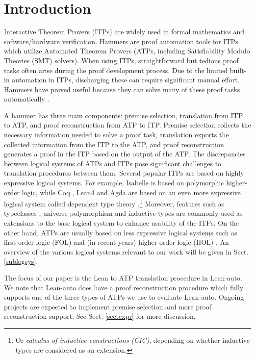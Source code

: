 \section{Introduction}

  Interactive Theorem Provers (ITPs) \cite{Harrison2014HistoryOI}
  are widely used in formal mathematics and software/hardware verification. Hammers
  \cite{Blanchette2016HammeringTQ,Czajka2018HammerFC} are proof automation tools for
  ITPs which utilize Automated Theorem Provers (ATPs, including Satisfiability Modulo Theories (SMT) solvers).
  When using ITPs, straightforward but tedious proof
  tasks often arise during the proof development process.  Due to the limited
  built-in automation in ITPs, discharging these can require significant
  manual effort. Hammers have proved useful
  because they can solve many of these proof tasks automatically \cite{Paulson2012ThreeYO}.
  
  A hammer has three main components: premise selection, translation from ITP to
  ATP, and proof reconstruction from ATP to ITP. Premise selection collects
  the necessary information needed to solve a proof task, translation exports
  the collected information from the ITP to the ATP, and proof reconstruction generates
  a proof in the ITP based on the output of the ATP. The discrepancies between logical systems of ATPs and ITPs pose
  significant challenges to translation procedures between them.
  Several popular ITPs are based on highly expressive logical systems.
  For example, Isabelle \cite{Isabelle} is based on polymorphic higher-order logic, while
  Coq \cite{CoqRefMan}, Lean4 \cite{Lean4} and Agda \cite{Agda}
  are based on an even more expressive logical system called dependent type
  theory \cite{LambdaWithType,Coquand1988}.\footnote{Or \textit{calculus of inductive constructions (CIC)}, depending
  on whether inductive types are considered as an extension.}
  Moreover, features such as typeclasses \cite{TypeClassHaskell}, universe polymorphism \cite{UPolyCoq} and inductive types \cite{CICIndDef}
  are commonly used as extensions to the base logical system to enhance usability of the ITPs.
  On the other hand, ATPs are usually based on less expressive logical systems such
  as first-order logic (FOL) \cite{CVC5,Vampire,Z3Paper,EProver} and (in recent years)
  higher-order logic (HOL) \cite{HOVampire,ZipperpositionMakeWork,HOEProver}.
  An overview of the various logical systems relevant to our work will be given in Sect. \ref{sublogsys}.

  The focus of our paper is the Lean to ATP translation procedure in Lean-auto.
  We note that Lean-auto does have a proof reconstruction procedure which fully supports
  one of the three types of ATPs we use to evaluate Lean-auto.
  Ongoing projects are expected to implement premise selection and more proof reconstruction support.
  See Sect. \ref{sectexpr} for more discussion.

